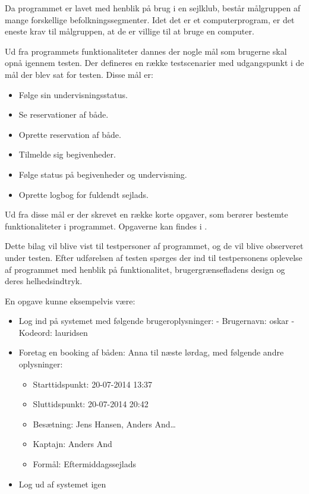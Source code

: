 Da programmet er lavet med henblik på brug i en sejlklub, består målgruppen af mange forskellige befolkningssegmenter. 
Idet det er et computerprogram, er det eneste krav til målgruppen, at de er villige til at bruge en computer.

Ud fra programmets funktionaliteter dannes der nogle mål som brugerne skal opnå igennem testen. 
Der defineres en række testscenarier med udgangspunkt i de mål der blev sat for testen.
Disse mål er:
\begin{itemize}
  \item Følge sin undervisningsstatus.
  \item Se reservationer af både.
  \item Oprette reservation af både.
  \item Tilmelde sig begivenheder.
  \item Følge status på begivenheder og undervisning.
  \item Oprette logbog for fuldendt sejlads.
\end{itemize}

Ud fra disse mål er der skrevet en række korte opgaver, som berører bestemte funktionaliteter i programmet. 
Opgaverne kan findes i .

Dette bilag vil blive vist til testpersoner af programmet, og de vil blive observeret under testen. 
Efter udførelsen af testen spørges der ind til testpersonens oplevelse af programmet med henblik på funktionalitet, brugergrænsefladens design og deres helhedsindtryk.

En opgave kunne eksempelvis være:
\begin{itemize}
	\item Log ind på systemet med følgende brugeroplysninger:
	\newline - Brugernavn: oskar
	\newline - Kodeord: lauridsen
	\item Foretag en booking af båden: Anna til næste lørdag, med følgende andre oplysninger: 
	\begin{itemize}
		\item Starttidspunkt: 20-07-2014 13:37
		\item Sluttidspunkt: 20-07-2014 20:42
		\item Besætning: Jens Hansen, Anders And\ldots
		\item Kaptajn: Anders And
		\item Formål: Eftermiddagssejlads
	\end{itemize}
	\item Log ud af systemet igen
\end{itemize}


